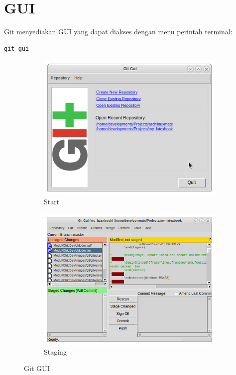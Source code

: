 \documentclass[12pt]{book}
\begin{document}
	\newpage
	\section{GUI}
	
	Git menyediakan GUI yang dapat diakses dengan menu perintah terminal:
	
	\begin{verbatim}
git gui
	\end{verbatim}
	
	\begin{figure}[!ht]
		\centering
		\begin{subfigure}[t]{0.45\textwidth}
			\includegraphics[width=\textwidth]{images/git/gitgui}
			\caption{Start}
		\end{subfigure}
		\begin{subfigure}[t]{0.45\textwidth}
			\includegraphics[width=\textwidth]{images/git/gitstage}
			\caption{Staging}
		\end{subfigure}
		\caption{Git GUI}
	\end{figure}
	
\end{document}

